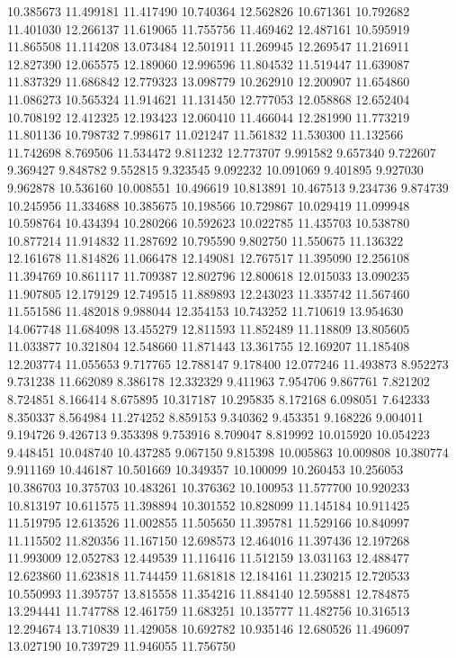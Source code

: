 10.385673
11.499181
11.417490
10.740364
12.562826
10.671361
10.792682
11.401030
12.266137
11.619065
11.755756
11.469462
12.487161
10.595919
11.865508
11.114208
13.073484
12.501911
11.269945
12.269547
11.216911
12.827390
12.065575
12.189060
12.996596
11.804532
11.519447
11.639087
11.837329
11.686842
12.779323
13.098779
10.262910
12.200907
11.654860
11.086273
10.565324
11.914621
11.131450
12.777053
12.058868
12.652404
10.708192
12.412325
12.193423
12.060410
11.466044
12.281990
11.773219
11.801136
10.798732
7.998617
11.021247
11.561832
11.530300
11.132566
11.742698
8.769506
11.534472
9.811232
12.773707
9.991582
9.657340
9.722607
9.369427
9.848782
9.552815
9.323545
9.092232
10.091069
9.401895
9.927030
9.962878
10.536160
10.008551
10.496619
10.813891
10.467513
9.234736
9.874739
10.245956
11.334688
10.385675
10.198566
10.729867
10.029419
11.099948
10.598764
10.434394
10.280266
10.592623
10.022785
11.435703
10.538780
10.877214
11.914832
11.287692
10.795590
9.802750
11.550675
11.136322
12.161678
11.814826
11.066478
12.149081
12.767517
11.395090
12.256108
11.394769
10.861117
11.709387
12.802796
12.800618
12.015033
13.090235
11.907805
12.179129
12.749515
11.889893
12.243023
11.335742
11.567460
11.551586
11.482018
9.988044
12.354153
10.743252
11.710619
13.954630
14.067748
11.684098
13.455279
12.811593
11.852489
11.118809
13.805605
11.033877
10.321804
12.548660
11.871443
13.361755
12.169207
11.185408
12.203774
11.055653
9.717765
12.788147
9.178400
12.077246
11.493873
8.952273
9.731238
11.662089
8.386178
12.332329
9.411963
7.954706
9.867761
7.821202
8.724851
8.166414
8.675895
10.317187
10.295835
8.172168
6.098051
7.642333
8.350337
8.564984
11.274252
8.859153
9.340362
9.453351
9.168226
9.004011
9.194726
9.426713
9.353398
9.753916
8.709047
8.819992
10.015920
10.054223
9.448451
10.048740
10.437285
9.067150
9.815398
10.005863
10.009808
10.380774
9.911169
10.446187
10.501669
10.349357
10.100099
10.260453
10.256053
10.386703
10.375703
10.483261
10.376362
10.100953
11.577700
10.920233
10.813197
10.611575
11.398894
10.301552
10.828099
11.145184
10.911425
11.519795
12.613526
11.002855
11.505650
11.395781
11.529166
10.840997
11.115502
11.820356
11.167150
12.698573
12.464016
11.397436
12.197268
11.993009
12.052783
12.449539
11.116416
11.512159
13.031163
12.488477
12.623860
11.623818
11.744459
11.681818
12.184161
11.230215
12.720533
10.550993
11.395757
13.815558
11.354216
11.884140
12.595881
12.784875
13.294441
11.747788
12.461759
11.683251
10.135777
11.482756
10.316513
12.294674
13.710839
11.429058
10.692782
10.935146
12.680526
11.496097
13.027190
10.739729
11.946055
11.756750
